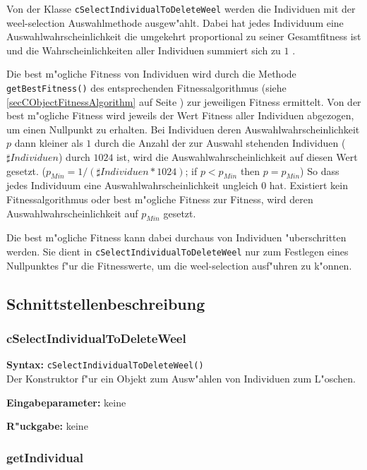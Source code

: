 Von der Klasse \verb|cSelectIndividualToDeleteWeel| werden die Individuen mit der weel-selection Auswahlmethode ausgew"ahlt. Dabei hat jedes Individuum eine Auswahlwahrscheinlichkeit die umgekehrt proportional zu seiner Gesamtfitness ist und die Wahrscheinlichkeiten aller Individuen summiert sich zu $1$ .

Die best m"ogliche Fitness von Individuen wird durch die Methode \verb|getBestFitness()| des entsprechenden Fitnessalgorithmus (siehe \ref{secCObjectFitnessAlgorithm} auf Seite \pageref{secCObjectFitnessAlgorithm}) zur jeweiligen Fitness ermittelt.
Von der best m"ogliche Fitness wird jeweils der Wert Fitness aller Individuen abgezogen, um einen Nullpunkt zu erhalten. Bei Individuen deren Auswahlwahrscheinlichkeit $p$ dann kleiner als $1$ durch die Anzahl der zur Auswahl stehenden Individuen ($\sharp Individuen$) durch $1024$ ist, wird die Auswahlwahrscheinlichkeit auf diesen Wert gesetzt. ($p_{Min}=1/(\sharp Individuen * 1024)$; if $p < p_{Min}$ then $p=p_{Min}$) So dass jedes Individuum eine Auswahlwahrscheinlichkeit ungleich $0$ hat.
Existiert kein Fitnessalgorithmus oder best m"ogliche Fitness zur Fitness, wird deren Auswahlwahrscheinlichkeit auf $p_{Min}$ gesetzt.

Die best m"ogliche Fitness kann dabei durchaus von Individuen "uberschritten werden. Sie dient in \verb|cSelectIndividualToDeleteWeel| nur zum Festlegen eines Nullpunktes f"ur die Fitnesswerte, um die weel-selection ausf"uhren zu k"onnen.


\subsection{Schnittstellenbeschreibung}

\subsubsection{cSelectIndividualToDeleteWeel}

\textbf{Syntax:} \verb|cSelectIndividualToDeleteWeel()| \\

Der Konstruktor f"ur ein Objekt zum Ausw"ahlen von Individuen zum L"oschen.

\bigskip\noindent
\textbf{Eingabeparameter:} keine

\bigskip\noindent
\textbf{R"uckgabe:} keine


\subsubsection{getIndividual}


